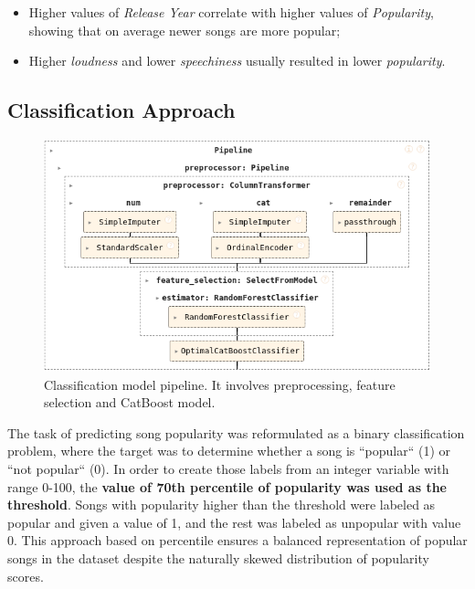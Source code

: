 \begin{itemize}
  \item Higher values of \textit{Release Year} correlate with higher values of
    \textit{Popularity}, showing that on average newer songs are more
    popular;
  \item Higher \textit{loudness} and lower \textit{speechiness}
    usually resulted in lower \textit{popularity}.
\end{itemize}



\subsection{Classification Approach}

\begin{center}
\begin{figure}[H]
  \centering
  \includegraphics[width=6in]{img/clf_pipeline.png}
  \caption{Classification model pipeline. It involves preprocessing, feature
  selection and CatBoost model.}
  \label{Figure:fig_beh}
\end{figure}
\end{center}

The task of predicting song popularity was reformulated as a binary
classification problem, where the target was to determine whether a song is
``popular`` (1) or ``not popular`` (0). In order to create those labels from an
integer variable with range 0-100, the \textbf{value of 70th percentile of
popularity was used as the threshold}. Songs with popularity higher than the
threshold were labeled as popular and given a value of 1, and the rest was
labeled as unpopular with value 0. This approach based on percentile ensures a
balanced representation of popular songs in the dataset despite the naturally
skewed distribution of popularity scores.

